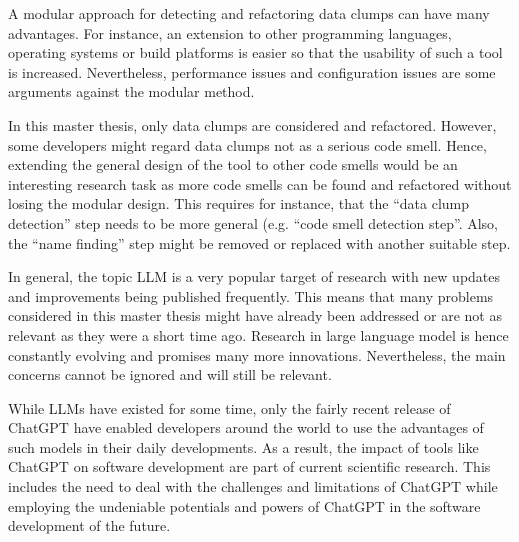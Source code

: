 A modular approach for detecting and refactoring data clumps can have many advantages.  For instance, an extension to other programming languages, operating systems or build platforms is easier so that the usability of such a tool is increased. Nevertheless, performance issues and configuration issues are some arguments against the modular method. 

In this master thesis, only data clumps are considered and refactored. However, some developers might regard data clumps not as a serious code smell. Hence, extending the general design of the tool to other code smells would be an interesting research task as more code smells can be found and refactored without losing the modular design. This requires for instance, that the \enquote{data clump detection} step needs to be more general (e.g. \enquote{code smell detection step}. Also, the \enquote{name finding} step might be removed or replaced with another suitable step. 

 

In general, the topic \ac{LLM} is a very popular target of research with new updates and improvements being published frequently. This means that many problems considered in this master thesis might have already been addressed or are not as relevant as they were a short time ago. Research in large language model is hence constantly evolving and promises many more innovations. Nevertheless, the main concerns cannot be ignored and will still be relevant.

While \acp{LLM}  have existed for some time, only the fairly recent release of ChatGPT have enabled developers around the world to use the advantages of such models in their daily developments. As a result, the impact of tools like ChatGPT on software development are part of current scientific research. This includes the need to deal with the challenges and limitations of ChatGPT while employing the undeniable potentials and powers of ChatGPT in the software development of the future. 



